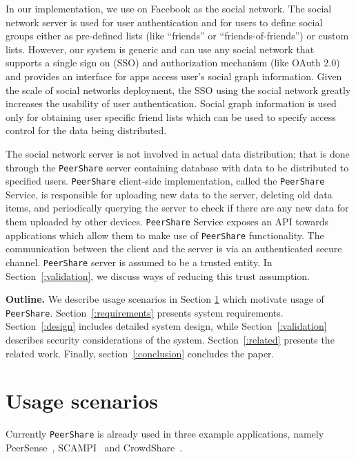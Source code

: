 \documentclass[twocolumn,a4paper,10pt]{article}
\newcommand{\peershare}{\texttt{PeerShare}\xspace}
\begin{document}
In our implementation, we use on Facebook as the social network.  The social network server is used for user authentication and for users to define social groups either as pre-defined lists (like ``friends'' or ``friends-of-friends'') or custom lists. However, our system is generic and can use any social network that supports a single sign on (SSO) and authorization mechanism (like OAuth 2.0) and provides an interface for apps access  user's social graph information. Given the scale of social networks deployment, the SSO using the social network greatly increases the usability of user authentication. Social graph information is used only for obtaining user specific friend lists which can be used to specify access control for the data being distributed.

The social network server is not involved in actual data distribution; that is done through the \peershare server containing database with data to be distributed to specified users. \peershare client-side implementation, called the \peershare Service, is responsible for uploading new data to the server, deleting old data items, and periodically querying the server to check if there are any new data for them uploaded by other devices. \peershare Service exposes an API towards applications which allow them to make use of \peershare functionality.  The communication between the client and the server is via an authenticated secure channel. \peershare server is assumed to be a trusted entity. In Section~\ref{:validation}, we discuss ways of reducing this trust assumption.

\textbf{Outline.} We describe usage scenarios in Section \ref{:usecase} which motivate usage of \peershare. Section~\ref{:requirements} presents system requirements. Section~\ref{:design} includes detailed system design, while Section~\ref{:validation} describes security considerations of the system. Section~\ref{:related} presents the related work. Finally, section~\ref{:conclusion} concludes the paper.

\section{Usage scenarios}
\label{:usecase}
Currently \peershare is already used in three example applications, namely PeerSense~\cite{DBLP:conf/percom/GuptaMNAW12}, SCAMPI~\cite{DBLP:journals/ccr/PitkanenKOCPGPLTHMHS12} and CrowdShare~\cite{CrowdShare-techrep}\cite{acns2013}.
\end{document}
